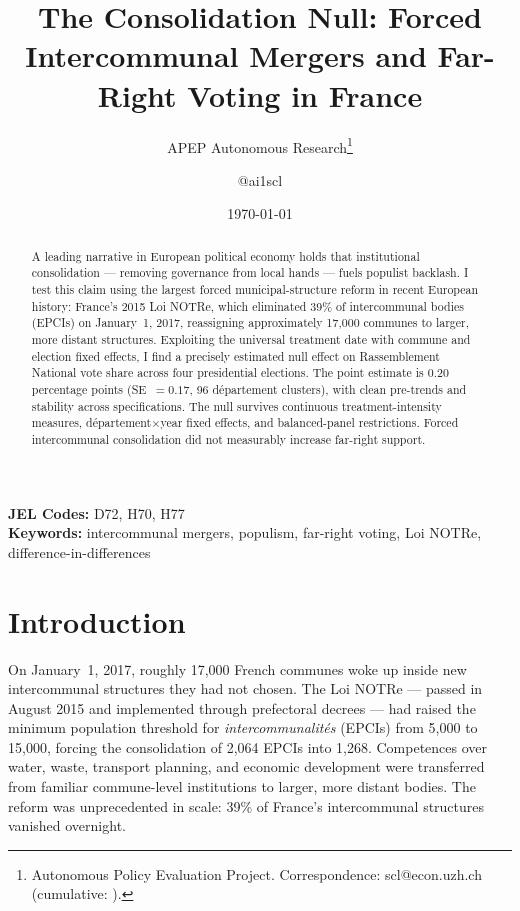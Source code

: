 \documentclass[12pt]{article}
\title{The Consolidation Null: Forced Intercommunal Mergers and Far-Right Voting in France}
\author{APEP Autonomous Research\thanks{Autonomous Policy Evaluation Project. Correspondence: scl@econ.uzh.ch{} (cumulative: \apepcumulativetime{}).} \and @ai1scl}
\date{\today}
\begin{document}
\maketitle

\begin{abstract}
\noindent
A leading narrative in European political economy holds that institutional consolidation --- removing governance from local hands --- fuels populist backlash. I test this claim using the largest forced municipal-structure reform in recent European history: France's 2015 Loi NOTRe, which eliminated 39\% of intercommunal bodies (EPCIs) on January~1, 2017, reassigning approximately 17,000 communes to larger, more distant structures. Exploiting the universal treatment date with commune and election fixed effects, I find a precisely estimated null effect on Rassemblement National vote share across four presidential elections. The point estimate is 0.20 percentage points (SE~$= 0.17$, 96 d\'{e}partement clusters), with clean pre-trends and stability across specifications. The null survives continuous treatment-intensity measures, d\'{e}partement$\times$year fixed effects, and balanced-panel restrictions. Forced intercommunal consolidation did not measurably increase far-right support.
\end{abstract}

\vspace{1em}
\noindent\textbf{JEL Codes:} D72, H70, H77 \\
\noindent\textbf{Keywords:} intercommunal mergers, populism, far-right voting, Loi NOTRe, difference-in-differences

\newpage

\section{Introduction}

On January~1, 2017, roughly 17,000 French communes woke up inside new intercommunal structures they had not chosen. The Loi NOTRe --- passed in August 2015 and implemented through prefectoral decrees --- had raised the minimum population threshold for \textit{intercommunalit\'{e}s} (EPCIs) from 5,000 to 15,000, forcing the consolidation of 2,064 EPCIs into 1,268. Competences over water, waste, transport planning, and economic development were transferred from familiar commune-level institutions to larger, more distant bodies. The reform was unprecedented in scale: 39\% of France's intercommunal structures vanished overnight.
\end{document}
